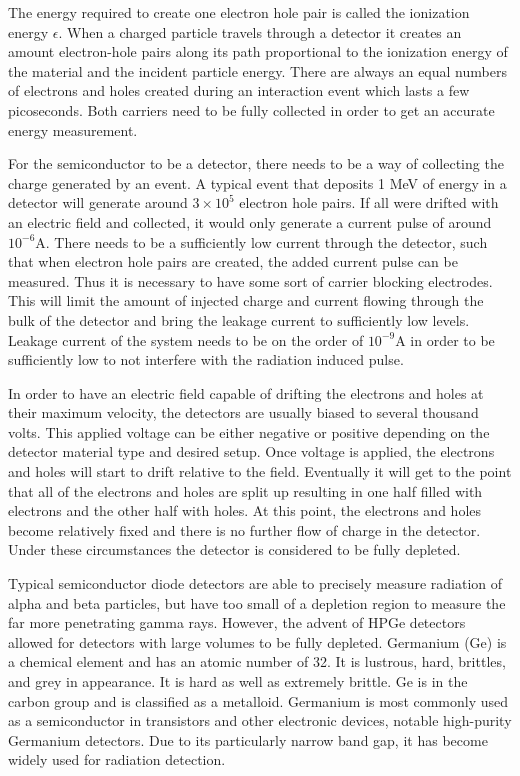 The energy required to create one electron hole pair is called the ionization energy $\epsilon$.
When a charged particle travels through a detector it creates an amount electron-hole pairs along its path proportional to the ionization energy of the material and the incident particle energy.
There are always an equal numbers of electrons and holes created during an interaction event which lasts a few picoseconds.
Both carriers need to be fully collected in order to get an accurate energy measurement.

For the semiconductor to be a detector, there needs to be a way of collecting the charge generated by an event.
A typical event that deposits 1 MeV of energy in a detector will generate around $3\times 10^{5}$ electron hole pairs.
If all were drifted with an electric field and collected, it would only generate a current pulse of around $10^{-6}$A.
There needs to be a sufficiently low current through the detector, such that when electron hole pairs are created, the added current pulse can be measured.
Thus it is necessary to have some sort of carrier blocking electrodes.
This will limit the amount of injected charge and current flowing through the bulk of the detector and bring the leakage current to sufficiently low levels.
Leakage current of the system needs to be on the order of $10^{-9}$A in order to be sufficiently low to not interfere with the radiation induced pulse.

In order to have an electric field capable of drifting the electrons and holes at their maximum velocity, the detectors are usually biased to several thousand volts.
This applied voltage can be either negative or positive depending on the detector material type and desired setup.
Once voltage is applied, the electrons and holes will start to drift relative to the field.
Eventually it will get to the point that all of the electrons and holes are split up resulting in one half filled with electrons and the other half with holes.
At this point, the electrons and holes become relatively fixed and there is no further flow of charge in the detector.
Under these circumstances the detector is considered to be fully depleted.

Typical semiconductor diode detectors are able to precisely measure radiation of alpha and beta particles, but have too small of a depletion region to measure the far more penetrating gamma rays.
However, the advent of HPGe detectors allowed for detectors with large volumes to be fully depleted.
Germanium (Ge) is a chemical element and has an atomic number of 32.
It is lustrous, hard, brittles, and grey in appearance.
It is hard as well as extremely brittle.
Ge is in the carbon group and is classified as a metalloid.
Germanium is most commonly used as a semiconductor in transistors and other electronic devices, notable high-purity Germanium detectors.
Due to its particularly narrow band gap, it has become widely used for radiation detection. 

